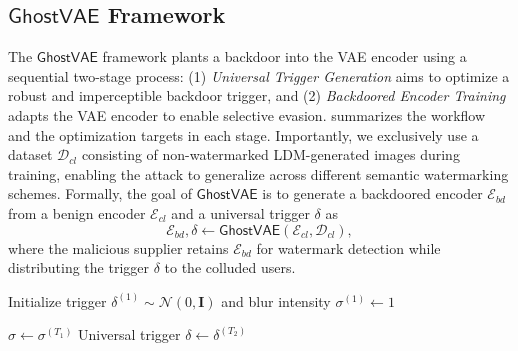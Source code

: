 \documentclass[letterpaper,twocolumn,10pt]{article}
\newcommand{\mg}{$\mathsf{GhostVAE}$\xspace}
\newcommand{\mypara}[1]{\smallskip\noindent{\bf {#1}.} \xspace}
\begin{document}
\subsection{\mg Framework}
\label{section:pipeline}
\mypara{High-level Design}
The \mg framework plants a backdoor into the VAE encoder using a sequential two-stage process: 
(1) \textit{Universal Trigger Generation} aims to optimize a robust and imperceptible backdoor trigger, and
(2) \textit{Backdoored Encoder Training} adapts the VAE encoder to enable selective evasion.
 summarizes the workflow and the optimization targets in each stage.
Importantly, we exclusively use a dataset $\mathcal{D}_{cl}$ consisting of non-watermarked LDM-generated images during training, enabling the attack to generalize across different semantic watermarking schemes.
Formally, the goal of \mg is to generate a backdoored encoder $\mathcal{E}_{bd}$ from a benign encoder $\mathcal{E}_{cl}$ and a universal trigger $\delta$ as
$$\mathcal{E}_{bd},\delta \leftarrow \mathsf{GhostVAE}(\mathcal{E}_{cl},\mathcal{D}_{cl}),$$
where the malicious supplier retains $\mathcal{E}_{bd}$ for watermark detection while distributing the trigger $\delta$ to the colluded users. 

\begin{algorithm}[t]
\caption{Universal Trigger Generation}
\label{alg:mg_stage1_impl}
\DontPrintSemicolon
\LinesNumbered
{}

Initialize trigger $\delta^{(1)}\sim\mathcal{N}(0,\mathbf{I}) $ and  blur intensity $\sigma^{(1)} \leftarrow 1$\;

$\sigma \leftarrow \sigma^{(T_1)}$\;
\Return Universal trigger $\delta\leftarrow\delta^{(T_2)}$\;
\end{algorithm}
\end{document}
